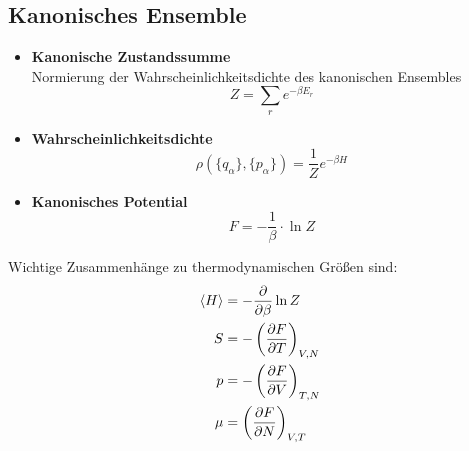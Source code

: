 \documentclass{article}
\newcommand{\lr}[1]{\left(#1\right)}
\begin{document}
\subsection{Kanonisches Ensemble}
	\begin{itemize}
		\item \textbf{Kanonische Zustandssumme}\\
		Normierung der Wahrscheinlichkeitsdichte des kanonischen Ensembles
			\begin{equation}
				Z = \sum_r e^{-\beta E_r}
			\end{equation}
		
		
		\item \textbf{Wahrscheinlichkeitsdichte}
			\begin{equation}
				\rho(\{q_\alpha\},\{p_\alpha\}) = \frac{1}{Z} e^{-\beta H}
			\end{equation}
		
		
		\item \textbf{Kanonisches Potential}
			\begin{equation}
				F = -\frac{1}{\beta} \cdot \ln Z
			\end{equation}
	\end{itemize}

Wichtige Zusammenhänge zu thermodynamischen Größen sind:
	\begin{align}
		\braket{H} &= - \frac{\partial}{\partial\beta} \ln Z \\
		S &= -\lr{ \frac{\partial F}{\partial T} }_{V,N} \\
		p &= -\lr{ \frac{\partial F}{\partial V} }_{T,N} \\
		\mu &= \lr{ \frac{\partial F}{\partial N} }_{V,T}
	\end{align}


\newpage
\end{document}
